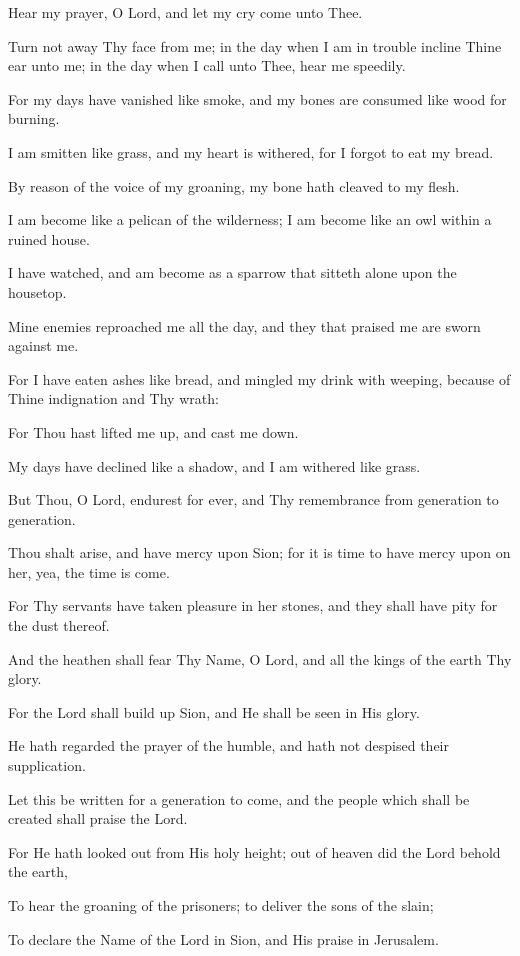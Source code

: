 Hear my prayer, O Lord, and let my cry come unto Thee.

Turn not away Thy face from me; in the day when I am in trouble incline Thine ear unto me; in the day when I call unto Thee, hear me speedily.

For my days have vanished like smoke, and my bones are consumed like wood for burning.

I am smitten like grass, and my heart is withered, for I forgot to eat my bread.

By reason of the voice of my groaning, my bone hath cleaved to my flesh.

I am become like a pelican of the wilderness; I am become like an owl within a ruined house.

I have watched, and am become as a sparrow that sitteth alone upon the housetop.

Mine enemies reproached me all the day, and they that praised me are sworn against me.

For I have eaten ashes like bread, and mingled my drink with weeping, because of Thine indignation and Thy wrath:

For Thou hast lifted me up, and cast me down.

My days have declined like a shadow, and I am withered like grass.

But Thou, O Lord, endurest for ever, and Thy remembrance from generation to generation.

Thou shalt arise, and have mercy upon Sion; for it is time to have mercy upon on her, yea, the time is come.

For Thy servants have taken pleasure in her stones, and they shall have pity for the dust thereof.

And the heathen shall fear Thy Name, O Lord, and all the kings of the earth Thy glory.

For the Lord shall build up Sion, and He shall be seen in His glory.

He hath regarded the prayer of the humble, and hath not despised their supplication.

Let this be written for a generation to come, and the people which shall be created shall praise the Lord.

For He hath looked out from His holy height; out of heaven did the Lord behold the earth,

To hear the groaning of the prisoners; to deliver the sons of the slain;

To declare the Name of the Lord in Sion, and His praise in Jerusalem.

